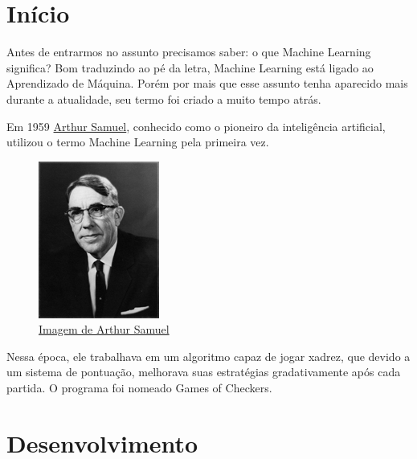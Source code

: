 \documentclass{article}
\begin{document}
    \Large
    
    \section{Início} \label{sec:introduction}

    Antes de entrarmos no assunto precisamos saber: o que Machine Learning significa? Bom traduzindo ao 
    pé da letra, Machine Learning está ligado ao Aprendizado de Máquina. Porém por mais que esse 
    assunto tenha aparecido mais durante a atualidade, seu termo foi criado a muito tempo atrás.

    Em 1959 \href{https://en.wikipedia.org/wiki/Arthur_Samuel}{Arthur Samuel}, conhecido como o 
    pioneiro da inteligência artificial, utilizou o termo Machine Learning pela primeira vez. 

    \begin{figure}[htp]
        \centering
        \includegraphics[scale=1.5]{ArthurSamuel.jpg}
        \caption{\href{https://youtu.be/pbVwH8o837A}{Imagem de Arthur Samuel}}
    \end{figure}

    Nessa época, ele trabalhava em um algoritmo capaz de jogar xadrez, que devido a um sistema de
    pontuação, melhorava suas estratégias gradativamente após cada partida. O programa foi nomeado
    Games of Checkers.

    \newpage
    \section{Desenvolvimento} \label{sec:desenvolvimento}
\end{document}

